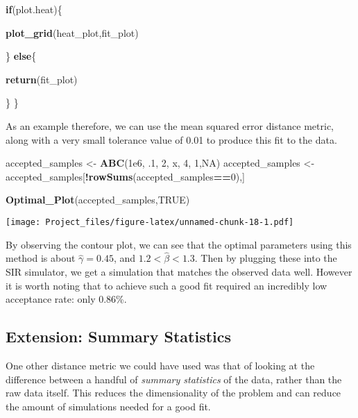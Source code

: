 \documentclass[
]{article}
\newenvironment{Shaded}{\begin{snugshade}}{\end{snugshade}}
\newcommand{\ConstantTok}[1]{\textcolor[rgb]{0.56,0.35,0.01}{#1}}
\newcommand{\ControlFlowTok}[1]{\textcolor[rgb]{0.13,0.29,0.53}{\textbf{#1}}}
\newcommand{\DecValTok}[1]{\textcolor[rgb]{0.00,0.00,0.81}{#1}}
\newcommand{\FloatTok}[1]{\textcolor[rgb]{0.00,0.00,0.81}{#1}}
\newcommand{\FunctionTok}[1]{\textcolor[rgb]{0.13,0.29,0.53}{\textbf{#1}}}
\newcommand{\NormalTok}[1]{#1}
\newcommand{\OtherTok}[1]{\textcolor[rgb]{0.56,0.35,0.01}{#1}}
\newcommand{\SpecialCharTok}[1]{\textcolor[rgb]{0.81,0.36,0.00}{\textbf{#1}}}
\begin{document}
\begin{Shaded}
\begin{Highlighting}[]
  \ControlFlowTok{if}\NormalTok{(plot.heat)\{}
    
    \FunctionTok{plot\_grid}\NormalTok{(heat\_plot,fit\_plot)}
    
\NormalTok{  \}}
  \ControlFlowTok{else}\NormalTok{\{}
    
    \FunctionTok{return}\NormalTok{(fit\_plot)}
    
\NormalTok{  \}}
\NormalTok{\}}
\end{Highlighting}
\end{Shaded}

As an example therefore, we can use the mean squared error distance
metric, along with a very small tolerance value of 0.01 to produce this
fit to the data.

\begin{Shaded}
\begin{Highlighting}[]
\NormalTok{accepted\_samples }\OtherTok{\textless{}{-}} \FunctionTok{ABC}\NormalTok{(}\FloatTok{1e6}\NormalTok{, .}\DecValTok{1}\NormalTok{, }\DecValTok{2}\NormalTok{, x, }\DecValTok{4}\NormalTok{, }\DecValTok{1}\NormalTok{,}\ConstantTok{NA}\NormalTok{)}
\NormalTok{accepted\_samples }\OtherTok{\textless{}{-}}\NormalTok{ accepted\_samples[}\SpecialCharTok{!}\FunctionTok{rowSums}\NormalTok{(accepted\_samples}\SpecialCharTok{==}\DecValTok{0}\NormalTok{),]}


\FunctionTok{Optimal\_Plot}\NormalTok{(accepted\_samples,}\ConstantTok{TRUE}\NormalTok{)}
\end{Highlighting}
\end{Shaded}

\texttt{[image: Project\_files/figure-latex/unnamed-chunk-18-1.pdf]}

By observing the contour plot, we can see that the optimal parameters
using this method is about \(\hat{\gamma} = 0.45\), and
\(1.2 < \hat{\beta} < 1.3\). Then by plugging these into the SIR
simulator, we get a simulation that matches the observed data well.
However it is worth noting that to achieve such a good fit required an
incredibly low acceptance rate: only 0.86\%.

\subsection{Extension: Summary
Statistics}\label{extension-summary-statistics}

One other distance metric we could have used was that of looking at the
difference between a handful of \emph{summary statistics} of the data,
rather than the raw data itself. This reduces the dimensionality of the
problem and can reduce the amount of simulations needed for a good fit.
\end{document}

